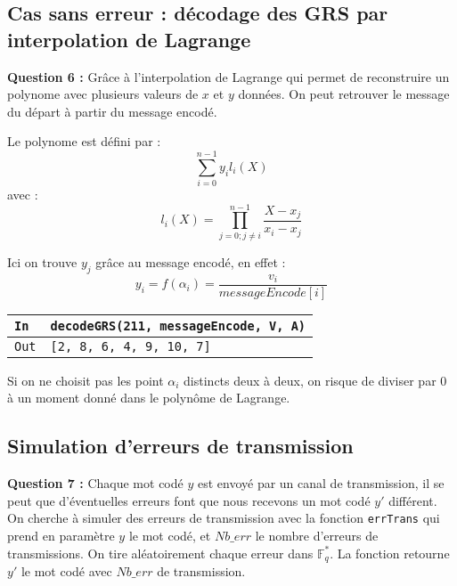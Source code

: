 \documentclass[titlepage]{article}
\begin{document}
        \subsection{Cas sans erreur : décodage des GRS par interpolation de Lagrange}
        \textbf{Question 6 :}
        Grâce à l'interpolation de Lagrange qui permet de reconstruire un polynome avec plusieurs valeurs de $x$ et $y$ données. 
        On peut retrouver le message du départ à partir du message encodé.

        Le polynome est défini par :
        \[\sum_{i=0}^{n-1}y_il_i(X)\]
        avec :
        \[l_i(X) = \prod_{j = 0; j \neq i}^{n - 1}\frac{X-x_j}{x_i-x_j} \]

        Ici on trouve $y_j$ grâce au message encodé, en effet : 
        \[y_i = f(\alpha_i) = \frac{v_i}{messageEncode[i]}\]

        

        \begin{tabularx}{12cm}{|p{0.60cm}|X|}
            \hline
            \rowcolor{gray}
            \texttt{In}
            & 
            \texttt{decodeGRS(211, messageEncode, V, A)}
            \\
            \hline
            \texttt{Out}
            &
            \texttt{[2, 8, 6, 4, 9, 10, 7]}
            \\
            \hline
        \end{tabularx}
        \bigbreak

        Si on ne choisit pas les point $\alpha_i$ distincts deux à deux, on risque de diviser par 0 à un moment donné dans le polynôme de Lagrange.

        \subsection{Simulation d’erreurs de transmission}
        \textbf{Question 7 :}
        Chaque mot codé $y$ est envoyé par un canal de transmission, il se peut que d'éventuelles erreurs font que nous recevons un mot codé $y'$ différent.
        On cherche à simuler des erreurs de transmission avec la fonction \texttt{errTrans} qui prend en paramètre $y$ le mot codé, et $Nb\_err$ le nombre d'erreurs de transmissions.
        On tire aléatoirement chaque erreur dans $\mathbb{F}_q^*$. La fonction retourne $y'$ le mot codé avec $Nb\_err$ de transmission.

        
\end{document}
